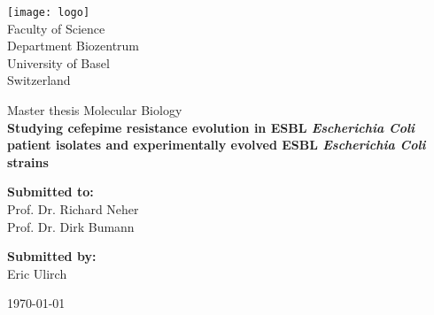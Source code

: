 \documentclass[12pt,twoside]{report}
\begin{document}
\begin{titlepage}
	\begin{center}
		\texttt{[image: logo]}\\
		\vspace{1cm}
		\Large
		Faculty of Science \\
		Department Biozentrum\\
		University of Basel\\
		Switzerland\\
		\date{\today}
		\vspace*{1cm}
		
		\Huge
		Master thesis Molecular Biology \\
		\vspace{2cm}
		\LARGE
		\textbf{Studying cefepime resistance evolution in ESBL \textit{Escherichia Coli} patient isolates and experimentally evolved ESBL \textit{Escherichia Coli} strains}
		
		\vspace{3cm}
		\begin{minipage}[t]{0.47\textwidth}
			\textnormal{\large{\bf Submitted to:\\}}
			{\large Prof. Dr. Richard Neher\\ Prof. Dr. Dirk Bumann}
		\end{minipage}\hfill\begin{minipage}[t]{0.47\textwidth}\raggedleft
			\textnormal{\large{\bf Submitted by:\\}}
			{\large Eric Ulirch}
		\end{minipage}			
		\vspace{3.5cm}
		\newline 
		\large{\today}

		
		
	\end{center}
\end{titlepage}
\end{document}
